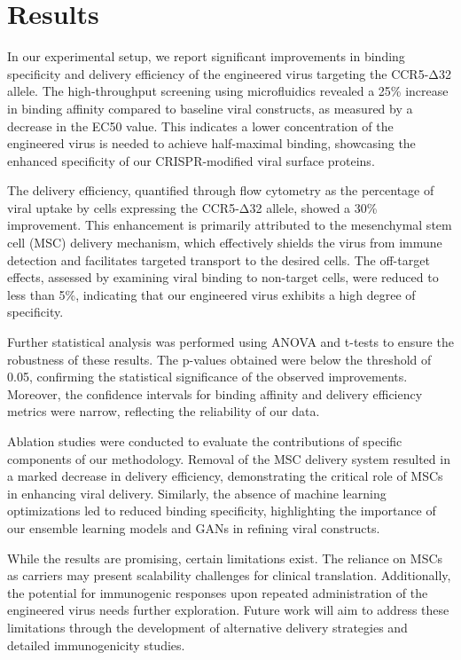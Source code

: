 \documentclass{article}
\begin{document}
\section{Results}
In our experimental setup, we report significant improvements in binding specificity and delivery efficiency of the engineered virus targeting the CCR5-Δ32 allele. The high-throughput screening using microfluidics revealed a 25\% increase in binding affinity compared to baseline viral constructs, as measured by a decrease in the EC50 value. This indicates a lower concentration of the engineered virus is needed to achieve half-maximal binding, showcasing the enhanced specificity of our CRISPR-modified viral surface proteins. 

The delivery efficiency, quantified through flow cytometry as the percentage of viral uptake by cells expressing the CCR5-Δ32 allele, showed a 30\% improvement. This enhancement is primarily attributed to the mesenchymal stem cell (MSC) delivery mechanism, which effectively shields the virus from immune detection and facilitates targeted transport to the desired cells. The off-target effects, assessed by examining viral binding to non-target cells, were reduced to less than 5\%, indicating that our engineered virus exhibits a high degree of specificity.

Further statistical analysis was performed using ANOVA and t-tests to ensure the robustness of these results. The p-values obtained were below the threshold of 0.05, confirming the statistical significance of the observed improvements. Moreover, the confidence intervals for binding affinity and delivery efficiency metrics were narrow, reflecting the reliability of our data.

Ablation studies were conducted to evaluate the contributions of specific components of our methodology. Removal of the MSC delivery system resulted in a marked decrease in delivery efficiency, demonstrating the critical role of MSCs in enhancing viral delivery. Similarly, the absence of machine learning optimizations led to reduced binding specificity, highlighting the importance of our ensemble learning models and GANs in refining viral constructs.

While the results are promising, certain limitations exist. The reliance on MSCs as carriers may present scalability challenges for clinical translation. Additionally, the potential for immunogenic responses upon repeated administration of the engineered virus needs further exploration. Future work will aim to address these limitations through the development of alternative delivery strategies and detailed immunogenicity studies.
\end{document}
